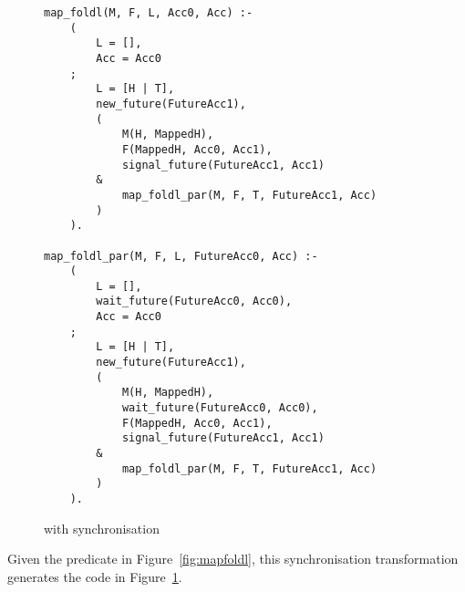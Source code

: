\begin{figure}
\begin{verbatim}
map_foldl(M, F, L, Acc0, Acc) :-
    (
        L = [],
        Acc = Acc0
    ;
        L = [H | T],
        new_future(FutureAcc1),
        (
            M(H, MappedH),
            F(MappedH, Acc0, Acc1),
            signal_future(FutureAcc1, Acc1)
        &
            map_foldl_par(M, F, T, FutureAcc1, Acc)
        )
    ).

map_foldl_par(M, F, L, FutureAcc0, Acc) :-
    (
        L = [],
        wait_future(FutureAcc0, Acc0),
        Acc = Acc0
    ;
        L = [H | T],
        new_future(FutureAcc1),
        (
            M(H, MappedH),
            wait_future(FutureAcc0, Acc0),
            F(MappedH, Acc0, Acc1),
            signal_future(FutureAcc1, Acc1)
        &
            map_foldl_par(M, F, T, FutureAcc1, Acc)
        )
    ).
\end{verbatim}
\caption{\mapfoldl{} with synchronisation}
\label{fig:map_foldl_sync}
\end{figure}

Given the \mapfoldl predicate in Figure~\ref{fig:mapfoldl},
this synchronisation transformation
generates the code in Figure~\ref{fig:map_foldl_sync}.



